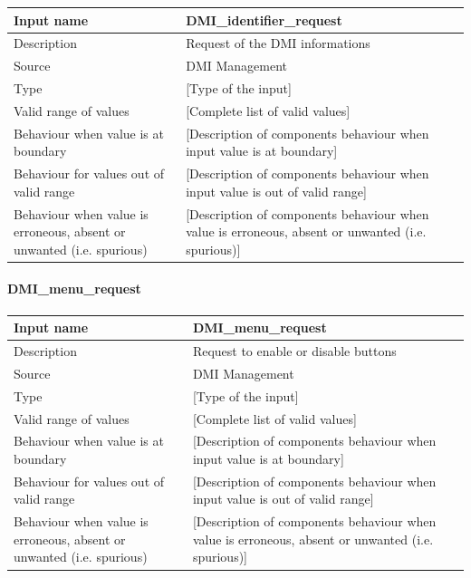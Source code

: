 \begin{longtable}{p{}p{}}
\toprule
Input name				& DMI\_identifier\_request \\
\midrule
Description				& Request of the DMI informations \\
\midrule
Source					& DMI Management \\ 
\midrule
Type					& [Type of the input] \\
\midrule
Valid range of values	& [Complete list of valid values] \\
\midrule
Behaviour when value is at boundary	& [Description of components behaviour when input value is at boundary] \\
\midrule
Behaviour for values out of valid range	& [Description of components behaviour when input value is out of valid range] \\
\midrule
Behaviour when value is erroneous, absent or unwanted (i.e. spurious) & [Description of components behaviour when value is erroneous, absent or unwanted (i.e. spurious)] \\
\bottomrule
\end{longtable}

\paragraph{DMI\_menu\_request}

\begin{longtable}{p{}p{}}
\toprule
Input name				& DMI\_menu\_request \\
\midrule
Description				& Request to enable or disable buttons \\
\midrule
Source					& DMI Management \\ 
\midrule
Type					& [Type of the input] \\
\midrule
Valid range of values	& [Complete list of valid values] \\
\midrule
Behaviour when value is at boundary	& [Description of components behaviour when input value is at boundary] \\
\midrule
Behaviour for values out of valid range	& [Description of components behaviour when input value is out of valid range] \\
\midrule
Behaviour when value is erroneous, absent or unwanted (i.e. spurious) & [Description of components behaviour when value is erroneous, absent or unwanted (i.e. spurious)] \\
\bottomrule
\end{longtable}


